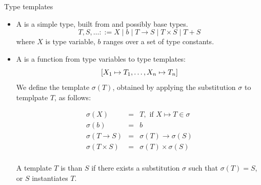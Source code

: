 \documentclass[paper=screen,mode=present,style=zysimple]{powerdot}
\begin{document}
\begin{slide}{Type templates}
\begin{itemize}
\item A  is a simple type, built from  and possibly base types.
\[
T, S, \ldots ::= X \mid b \mid T \to S \mid T \times S \mid T + S
\]
where $X$ is type variable, $b$ ranges over a set of type constants.
\item A  is a function from type variables to type templates: 
\vspace*{-0.5em}
  $$[X_1 \mapsto T_1, \ldots, X_n \mapsto T_n]  \vspace*{-0.5em}$$
We define the template $\sigma(T)$, obtained by applying the substitution $\sigma$ to templpate $T$, 
as follows:
\begin{smalltext}
\vspace*{-0.5em}
\begin{eqnarray*}
\sigma(X) & = & T, \mbox{ if $X \mapsto T \in \sigma$}
\\
\sigma (b) & = & b
\\
\sigma (T \to S) & = & \sigma(T) \to \sigma(S) 
\\
\sigma (T \times S) & = & \sigma(T) \times \sigma(S) 
\\[-2em]
\end{eqnarray*}
\end{smalltext}
A template $T$ is  than $S$ if there exists a substitution $\sigma$ 
such that $\sigma(T) = S$, or $S$ instantiates $T$.
\end{itemize}
\end{slide}
\end{document}
